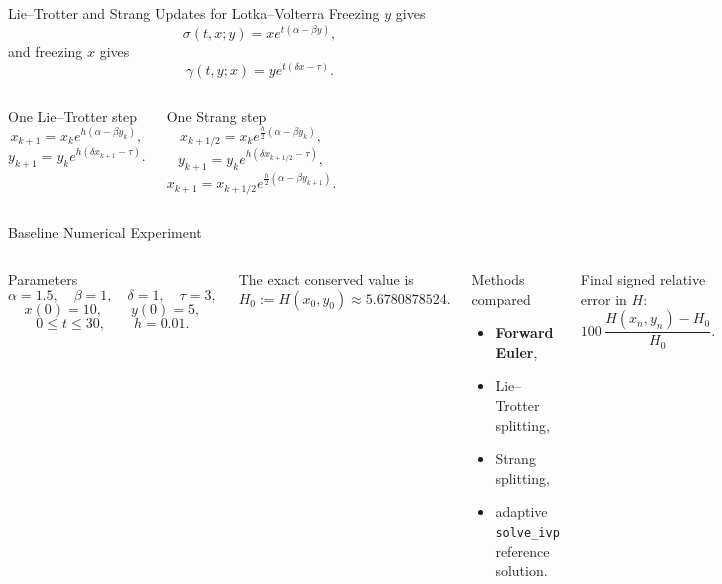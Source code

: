 \documentclass[aspectratio=169,11pt]{beamer}
\begin{document}
\begin{frame}{Lie--Trotter and Strang Updates for Lotka--Volterra}
Freezing \(y\) gives
\[
  \sigma(t,x;y)=xe^{t(\alpha-\beta y)},
\]
and freezing \(x\) gives
\[
  \gamma(t,y;x)=ye^{t(\delta x-\tau)}.
\]

\begin{columns}[T,onlytextwidth]
\begin{block}{One Lie--Trotter step}
\[
 x_{k+1}=x_k e^{h(\alpha-\beta y_k)},
\]
\[
 y_{k+1}=y_k e^{h(\delta x_{k+1}-\tau)}.
\]
\end{block}
\begin{block}{One Strang step}
\[
 x_{k+1/2}=x_k e^{\frac h2(\alpha-\beta y_k)},
\]
\[
 y_{k+1}=y_k e^{h(\delta x_{k+1/2}-\tau)},
\]
\[
 x_{k+1}=x_{k+1/2}e^{\frac h2(\alpha-\beta y_{k+1})}.
\]
\end{block}
\end{columns}
\end{frame}

\begin{frame}{Baseline Numerical Experiment}
\small
\begin{columns}[T,onlytextwidth]
\begin{block}{Parameters}
\[
\alpha=1.5,\quad \beta=1,\quad \delta=1,\quad \tau=3,
\]
\[
x(0)=10,\qquad y(0)=5,
\]
\[
0\le t\le30,\qquad h=0.01.
\]
\end{block}
The exact conserved value is
\[
H_0:=H(x_0,y_0)\approx5.6780878524.
\]

\begin{alertblock}{Methods compared}
\begin{itemize}
  \item \textbf{Forward Euler},
  \item Lie--Trotter splitting,
  \item Strang splitting,
  \item adaptive \texttt{solve\_ivp} reference solution.
\end{itemize}
\end{alertblock}

Final signed relative error in \(H\):
\[
\boxed{
100\,\frac{H(x_n,y_n)-H_0}{H_0}.
}
\]
\end{columns}
\end{frame}
\end{document}
